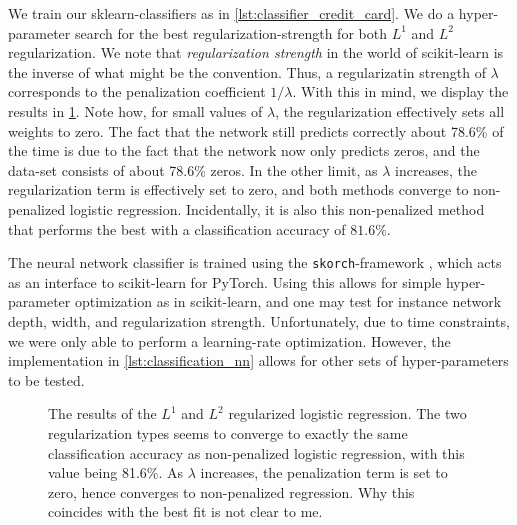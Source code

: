 \documentclass[a4paper, 11pt, oneside, article]{memoir}
\begin{document}
	We train our sklearn-classifiers as in
	\cref{lst:classifier_credit_card}. We do a hyper-parameter search for
	the best regularization-strength for both \( L^1 \) and \( L^2 \)
	regularization. We note that \emph{regularization strength} in the
	world of scikit-learn is the inverse of what might be the convention.
	Thus, a regularizatin strength of \( \lambda \) corresponds to the
	penalization coefficient \(  1 / \lambda \). With this in mind, we
	display the results in \cref{fig:credit_cards_classical}. Note how, for
	small values of \( \lambda \), the regularization effectively sets all
	weights to zero. The fact that the network still predicts correctly
	about 78.6\% of the time is due to the fact that the network now only
	predicts zeros, and the data-set consists of about 78.6\% zeros. In the
	other limit, as \( \lambda \) increases, the regularization term is
	effectively set to zero, and both methods converge to non-penalized
	logistic regression. Incidentally, it is also this non-penalized method
	that performs the best with a classification accuracy of \( 81.6 \% \).
	
	
	The neural network classifier is trained using the
	\texttt{skorch}-framework \cite{SkorchdevSkorch2019}, which
	acts as an interface to scikit-learn for PyTorch. Using this allows for
	simple hyper-parameter optimization as in scikit-learn, and one may
	test for instance network depth, width, and regularization strength.
	Unfortunately, due to time constraints, we were only able to perform a
	learning-rate optimization.  However, the implementation in
	\cref{lst:classification_nn} allows for other sets of hyper-parameters
	to be tested. 

	\begin{figure}[htpb]
		\centering
		\caption{The results of the \( L^1 \) and \( L^2 \) regularized
			logistic regression.  The two regularization types
			seems to converge to exactly the same classification
			accuracy as non-penalized logistic regression, with
			this value being 81.6\%. As \( \lambda \) increases,
		the penalization term is set to zero, hence converges to
	non-penalized regression. Why this coincides with the best fit is not
clear to me.  }%
		\label{fig:credit_cards_classical}
	\end{figure}
\end{document}
